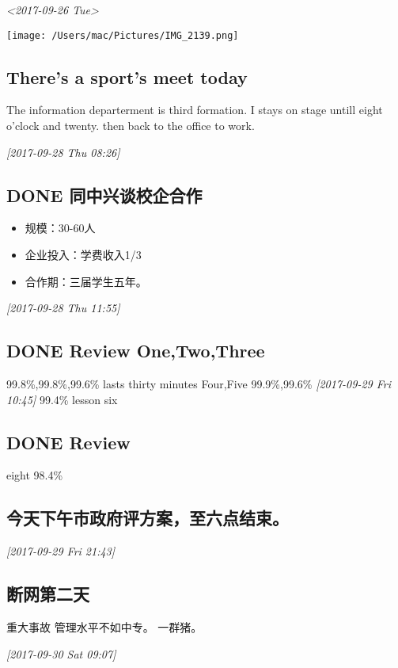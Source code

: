 \documentclass[11pt]{ctexart}
\begin{document}
\textit{<2017-09-26 Tue>}
\begin{center}
\texttt{[image: /Users/mac/Pictures/IMG\_2139.png]}
\end{center}

\subsection{There's a sport's meet today}
\label{sec:orgabd79fb}
The information departerment is third formation.
I stays on stage untill eight o'clock and twenty.
then back to the office to work.

\textit{[2017-09-28 Thu 08:26]}

\subsection{{\bfseries\sffamily DONE} 同中兴谈校企合作}
\label{sec:org0c13c79}
\begin{itemize}
\item 规模：30-60人
\item 企业投入：学费收入1/3
\item 合作期：三届学生五年。
\end{itemize}
\textit{[2017-09-28 Thu 11:55]}

\subsection{{\bfseries\sffamily DONE} Review One,Two,Three}
\label{sec:org4cad785}
99.8\%,99.8\%,99.6\%
lasts thirty minutes
Four,Five
99.9\%,99.6\%
\textit{[2017-09-29 Fri 10:45]}
99.4\% lesson six
\subsection{{\bfseries\sffamily DONE} Review}
\label{sec:org916387d}
eight 98.4\%
\subsection{今天下午市政府评方案，至六点结束。}
\label{sec:orge65626d}

\textit{[2017-09-29 Fri 21:43]}

\subsection{断网第二天}
\label{sec:org330563b}
重大事故
管理水平不如中专。
一群猪。


\textit{[2017-09-30 Sat 09:07]}
\end{document}
